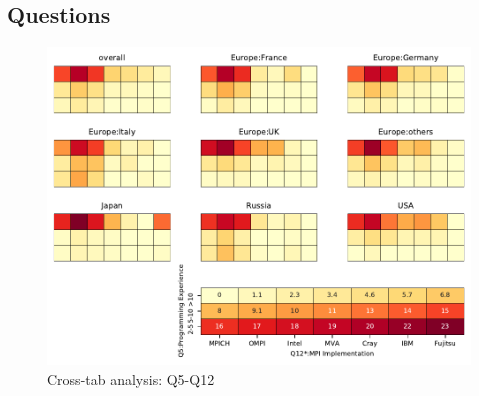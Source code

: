 
\subsection{Questions}


\begin{figure}
\begin{center}
\includegraphics[width=12cm]{../pdfs/Q5-Q12.pdf}
\caption{Cross-tab analysis: Q5-Q12}
\label{fig:Q5-Q12}
\end{center}
\end{figure}
